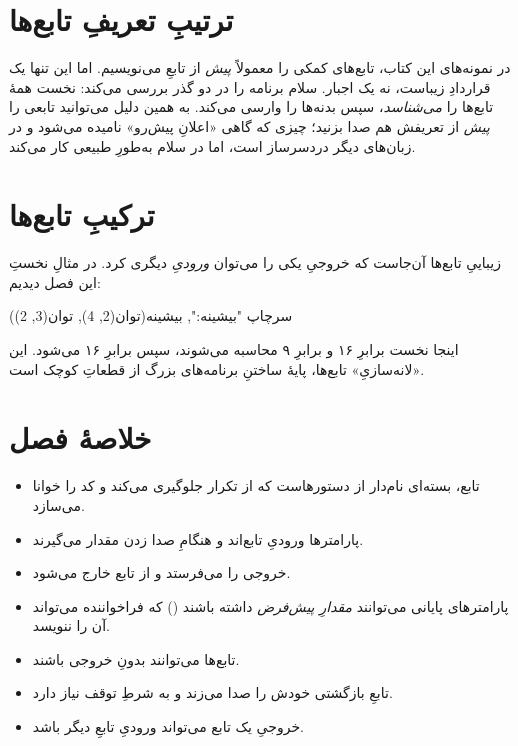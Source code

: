 \section{ترتیبِ تعریفِ تابع‌ها}

در نمونه‌های این کتاب، تابع‌های کمکی را معمولاً \emph{پیش} از تابعِ 
می‌نویسیم. اما این تنها یک قراردادِ زیباست، نه یک اجبار. سلام برنامه را در دو
گذر بررسی می‌کند: نخست همهٔ تابع‌ها را \emph{می‌شناسد}، سپس بدنه‌ها را وارسی
می‌کند. به همین دلیل می‌توانید تابعی را \emph{پیش} از تعریفش هم صدا بزنید؛
چیزی که گاهی «اعلانِ پیش‌رو» نامیده می‌شود و در زبان‌های دیگر دردسرساز است، اما
در سلام به‌طورِ طبیعی کار می‌کند.

\section{ترکیبِ تابع‌ها}

زیباییِ تابع‌ها آن‌جاست که خروجیِ یکی را می‌توان \emph{ورودیِ} دیگری کرد. در
مثالِ نخستِ این فصل دیدیم:

\begin{salamfa}
سرچاپ "بیشینه:", بیشینه(توان(2, 4), توان(3, 2))
\end{salamfa}

اینجا نخست  برابرِ ۱۶ و  برابرِ ۹ محاسبه
می‌شوند، سپس  برابرِ ۱۶ می‌شود. این «لانه‌سازیِ» تابع‌ها، پایهٔ
ساختنِ برنامه‌های بزرگ از قطعاتِ کوچک است.

\section{خلاصهٔ فصل}

\begin{itemize}
  \item تابع، بسته‌ای نام‌دار از دستورهاست که از تکرار جلوگیری می‌کند و کد را
        خوانا می‌سازد.
  \item پارامترها ورودیِ تابع‌اند و هنگامِ صدا زدن مقدار می‌گیرند.
  \item {} خروجی را می‌فرستد و از تابع خارج می‌شود.
  \item پارامترهای پایانی می‌توانند \emph{مقدارِ پیش‌فرض} داشته باشند
        () که فراخواننده می‌تواند آن را ننویسد.
  \item تابع‌ها می‌توانند بدونِ خروجی باشند.
  \item تابعِ بازگشتی خودش را صدا می‌زند و به شرطِ توقف نیاز دارد.
  \item خروجیِ یک تابع می‌تواند ورودیِ تابعِ دیگر باشد.
\end{itemize}

